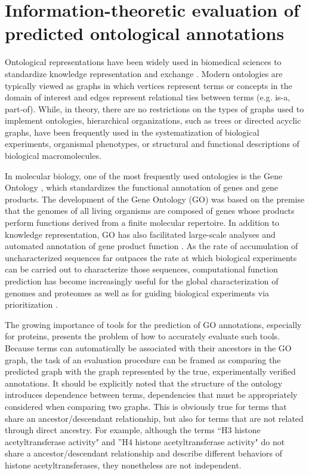 \chapter{Information-theoretic evaluation of predicted ontological annotations}
\label{ch:rumi}

%




Ontological representations have been widely used in biomedical sciences to standardize knowledge representation and exchange \citep{Robinson2011}. Modern ontologies are typically viewed as graphs in which vertices represent terms or concepts in the domain of interest and edges represent relational ties between terms (e.g. is-a, part-of). While, in theory, there are no restrictions on the types of graphs used to implement ontologies, hierarchical organizations, such as trees or directed acyclic graphs, have been frequently used in the systematization of biological experiments, organismal phenotypes, or structural and functional descriptions of biological macromolecules.

In molecular biology, one of the most frequently used ontologies is the Gene Ontology \citep{Ashburner2000}, which standardizes the functional annotation of genes and gene products. The development of the Gene Ontology (GO) was based on the premise that the genomes of all living organisms are composed of genes whose products perform functions derived from a finite molecular repertoire. In addition to knowledge representation, GO has also facilitated large-scale analyses and automated annotation of gene product function \citep{Radivojac2013}. As the rate of accumulation of uncharacterized sequences far outpaces the rate at which biological experiments can be carried out to characterize those sequences, computational function prediction has become increasingly useful for the global characterization of genomes and proteomes as well as for guiding biological experiments via prioritization  \citep{Sharan2007,Rentzsch2009}.

The growing importance of tools for the prediction of GO annotations, especially for proteins, presents the problem of how to accurately evaluate such tools. Because terms can automatically be associated with their ancestors in the GO graph, the task of an evaluation procedure can be framed as comparing the predicted graph with the graph represented by the true, experimentally verified annotations. It should be explicitly noted that the structure of the ontology introduces dependence between terms, dependencies that must be appropriately considered when comparing two graphs. This is obviously true for terms that share an ancestor/descendant relationship, but also for terms that are not related through direct ancestry.  For example, although the terms ``H3 histone acetyltransferase activity" and ''H4 histone acetyltransferase activity" do not share a ancestor/descendant relationship and describe different behaviors of histone acetyltransferases, they nonetheless are not independent. 

